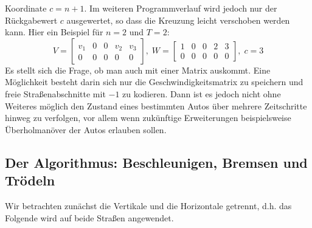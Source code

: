 Koordinate \(c = n+1\). Im weiteren Programmverlauf wird jedoch nur der Rückgabewert \(c\) ausgewertet, so dass die Kreuzung
leicht verschoben werden kann. Hier ein Beispiel für \(n=2\) und \(T=2\):
\[
  V = 
  \begin{bmatrix}
    v_1& 0& 0& v_2& v_3 \\
    0& 0& 0& 0& 0
  \end{bmatrix}, \;
  W = 
  \begin{bmatrix}
    1& 0& 0& 2& 3 \\
    0& 0& 0& 0& 0
  \end{bmatrix}, \;
  c = 3
\]
Es stellt sich die Frage, ob man auch mit einer Matrix auskommt. Eine Möglichkeit besteht darin sich nur die Geschwindigkeitsmatrix 
zu speichern und freie Straßenabschnitte mit \(-1\) zu kodieren. Dann ist es jedoch nicht ohne Weiteres möglich den Zustand eines bestimmten Autos über
mehrere Zeitschritte hinweg zu verfolgen, vor allem wenn zukünftige Erweiterungen beispielsweise Überholmanöver der Autos erlauben sollen.

\subsection{Der Algorithmus: Beschleunigen, Bremsen und Trödeln}
Wir betrachten zunächst die Vertikale und die Horizontale getrennt, d.h. das Folgende wird
auf beide Straßen angewendet.

